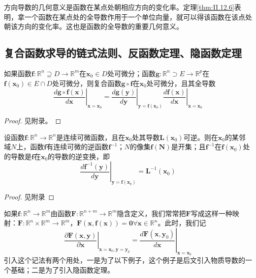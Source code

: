 \documentclass[main.tex]{subfiles}
\begin{document}
方向导数的几何意义是函数在某点处朝相应方向的变化率。定理\ref{thm:II.12.6}表明，拿一个函数在某点处的全导数作用于一个单位向量，就可以得该函数在该点处朝该方向的变化率。这也是函数的全导数的重要几何意义。
\subsection{复合函数求导的链式法则、反函数定理、隐函数定理}
\begin{theorem}[复合函数求导的链式法则]\label{thm:II.12.7}
如果函数$\mathbf{f}:\mathbb{R}^n\supseteq D\rightarrow\mathbb{R}^m$在$\mathbf{x}_0\in D$处可微分；函数$\mathbf{g}:\mathbb{R}^n\supset E\rightarrow\mathbb{R}^p$在$\mathbf{f}\left(\mathbf{x}_0\right)\in E\cap D$处可微分，则复合函数$\mathbf{g}\circ\mathbf{f}$在$\mathbf{x}_0$处可微分，且其全导数
\[
\left.\frac{d\mathbf{g}\circ\mathbf{f}\left(\mathbf{x}\right)}{d\mathbf{x}}\right|_{\mathbf{x}=\mathbf{x}_0}=\left.\frac{d\mathbf{g}\left(\mathbf{y}\right)}{d\mathbf{y}}\right|_{\mathbf{y}=\mathbf{f}\left(\mathbf{x}_0\right)}\left.\frac{d\mathbf{f}\left(\mathbf{x}\right)}{d\mathbf{x}}\right|_{\mathbf{x}=\mathbf{x}_0}
\]
\end{theorem}
\begin{proof}
见附录。
\end{proof}

\begin{theorem}[反函数定理]\label{thm:II.12.8}
设函数$\mathbf{f}:\mathbb{R}^n\rightarrow\mathbb{R}^n$是连续可微函数，且在$\mathbf{x}_0$处其导数$\mathbf{L}\left(\mathbf{x}_0\right)$可逆。则在$\mathbf{x}_0$的某邻域$N$上，函数$\mathbf{f}$有连续可微的逆函数$\mathbf{f}^{-1}$；$N$的像集$\mathbf{f}\left(\mathbf{N}\right)$是开集；且$\mathbf{f}^{-1}$在$\mathbf{f}\left(\mathbf{x}_0\right)$处的导数是$\mathbf{f}$在$\mathbf{x}_0$的导数的逆变换，即
\[\left.\frac{d\mathbf{f}^{-1}\left(\mathbf{y}\right)}{d\mathbf{y}}\right|_{\mathbf{y}=\mathbf{f}\left(\mathbf{x}_0\right)}=\mathbf{L}^{-1}\left(\mathbf{x}_0\right)\]
\end{theorem}
\begin{proof}
见附录
\end{proof}

如果$\mathbf{f}:\mathbb{R}^n\rightarrow\mathbb{R}^m$由函数$\mathbf{F}:\mathbb{R}^{n+m}\rightarrow\mathbb{R}^m$隐含定义，我们常常把$\mathbf{F}$写成这样一种映射：$\mathbf{F}:\mathbb{R}^n\times\mathbb{R}^m\rightarrow\mathbb{R}^m$，$\mathbf{F}\left(\mathbf{x},\mathbf{f}\left(\mathbf{x}\right)\right)=\mathbf{0}\forall\mathbf{x}\in\mathbb{R}^n$。此时，我们记
\[\left.\frac{\partial \mathbf{F}\left(\mathbf{x},\mathbf{y}\right)}{\partial \mathbf{x}}\right|_{\mathbf{x}=\mathbf{x}_0,\mathbf{y}=\mathbf{y}_0}=\left.\frac{d\mathbf{F}\left(\mathbf{x},\mathbf{y}_0\right)}{d\mathbf{x}}\right|_{\mathbf{x}=\mathbf{x}_0}\]
引入这个记法有两个用处，一是为了以下例子，这个例子是后文引入物质导数的一个基础；二是为了引入隐函数定理。
\end{document}
